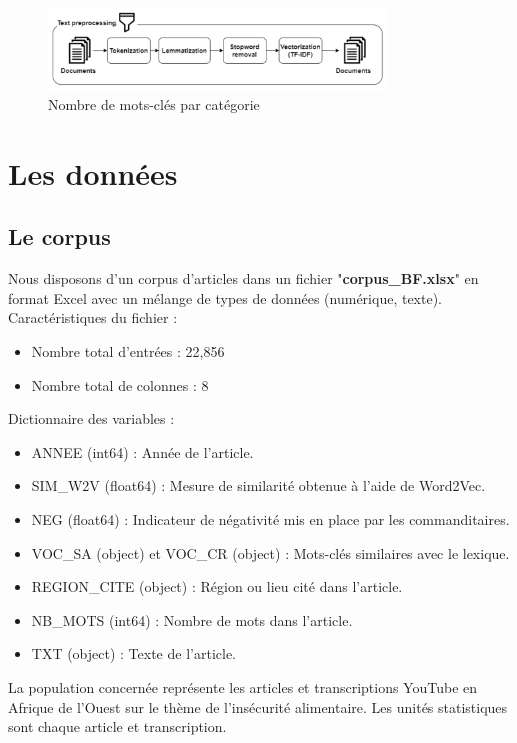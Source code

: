 \documentclass{article}
\begin{document}
\begin{figure}[h]
    \centering
    \includegraphics[width=0.8\textwidth]{text_process.png}
    \caption{Nombre de mots-clés par catégorie}
    \label{fig:keops_fraiberger}
\end{figure}

\section{Les données}
\subsection{Le corpus}
Nous disposons d'un corpus d'articles dans un fichier "\textbf{corpus_BF.xlsx}" en format Excel avec un mélange de types de données (numérique, texte). \\

Caractéristiques du fichier :
\begin{itemize}
    \item Nombre total d'entrées : 22,856
    \item Nombre total de colonnes : 8 \\
\end{itemize}

Dictionnaire des variables :
\begin{itemize}
    \item ANNEE (int64) : Année de l'article.
    \item SIM_W2V (float64) : Mesure de similarité obtenue à l'aide de Word2Vec.
    \item NEG (float64) : Indicateur de négativité mis en place par les commanditaires.
    \item VOC_SA (object) et VOC_CR (object) : Mots-clés similaires avec le lexique.
    \item REGION_CITE (object) : Région ou lieu cité dans l'article.
    \item NB_MOTS (int64) : Nombre de mots dans l'article.
    \item TXT (object) : Texte de l'article. \\
\end{itemize}

La population concernée représente les articles et transcriptions YouTube en Afrique de l'Ouest sur le thème de l'insécurité alimentaire. Les unités statistiques sont chaque article et transcription. 
\end{document}
